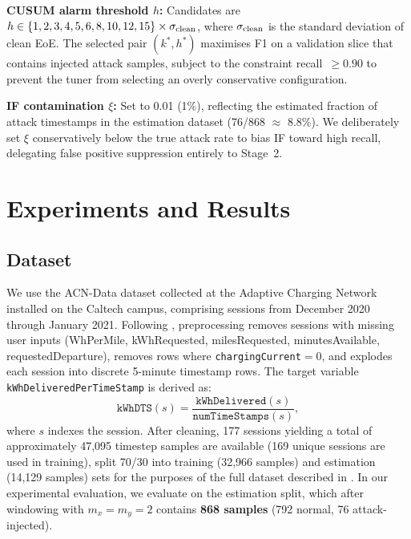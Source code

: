 \documentclass[journal]{IEEEtran}
\begin{document}
\textbf{CUSUM alarm threshold $h$:}
Candidates are $h \in \{1, 2, 3, 4, 5, 6, 8, 10, 12, 15\} \times \sigma_{\rm clean}$,
where $\sigma_{\rm clean}$ is the standard deviation of clean EoE.
The selected pair $(k^*, h^*)$ maximises F1 on a validation slice that
contains injected attack samples, subject to the constraint
recall~$\geq 0.90$ to prevent the tuner from selecting an
overly conservative configuration.

\textbf{IF contamination $\xi$:}
Set to 0.01 (1\%), reflecting the estimated fraction of attack
timestamps in the estimation dataset (76/868 $\approx$ 8.8\%). We
deliberately set $\xi$ conservatively below the true attack rate to
bias IF toward high recall, delegating false positive suppression
entirely to Stage~2.

\section{Experiments and Results}
\label{sec:experiments}

\subsection{Dataset}

We use the ACN-Data dataset \cite{lee2019acn} collected at the
Adaptive Charging Network installed on the Caltech campus, comprising
sessions from December 2020 through January 2021. Following
\cite{basumatary2025}, preprocessing removes sessions with missing
user inputs (WhPerMile, kWhRequested, milesRequested, minutesAvailable,
requestedDeparture), removes rows where \texttt{chargingCurrent}$=0$,
and explodes each session into discrete 5-minute timestamp rows.
The target variable \texttt{kWhDeliveredPerTimeStamp} is derived as:
\begin{equation}
\texttt{kWhDTS}(s) = \frac{\texttt{kWhDelivered}(s)}{\texttt{numTimeStamps}(s)},
\end{equation}
where $s$ indexes the session. After cleaning, 177 sessions yielding
a total of approximately 47,095 timestep samples are available
(169 unique sessions are used in training), split 70/30 into training
(32,966 samples) and estimation (14,129 samples) sets for the
purposes of the full dataset described in \cite{basumatary2025}.
In our experimental evaluation, we evaluate on the estimation split,
which after windowing with $m_x=m_y=2$ contains \textbf{868 samples}
(792 normal, 76 attack-injected).
\end{document}
